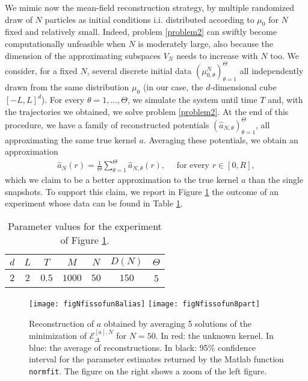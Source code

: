 We mimic now the  mean-field reconstruction strategy, by multiple randomized draw of $N$ particles as initial conditions i.i. distributed according to $\mu_0$ for $N$ fixed and relatively small. Indeed, problem \eqref{problem2} can swiftly become computationally unfeasible when $N$ is moderately large, also because the dimension of the approximating subspaces $V_N$ needs to increase with $N$ too.  We consider, for a fixed $N$, several discrete initial data $(\mu^N_{0,\theta})_{\theta= 1}^{\Theta}$ all independently drawn from the same distribution $\mu_0$ (in our case, the $d$-dimensional cube $[-L,L]^d$). For every $\theta = 1,\ldots,\Theta$, we simulate the system until time $T$ and, with the trajectories we obtained, we solve problem \eqref{problem2}. At the end of this procedure, we have a family of reconstructed potentials $(\widehat{a}_{N,\theta})_{\theta= 1}^{\Theta}$, all approximating the same true kernel $a$. Averaging these potentials, we obtain an approximation
\begin{align*}
\widehat{a}_N(r) = \frac{1}{\Theta} \sum^{\Theta}_{\theta = 1}\widehat{a}_{N,\theta}(r), \quad \text{ for every } r \in [0,R],
\end{align*}
which we claim to be a better approximation to the true kernel $a$ than the single snapshots. To support this claim, we report in Figure \ref{fixedN} the outcome of an experiment whose data can be found in Table \ref{tab:fig5}.

\begin{table}[h]
\begin{center}
\begin{tabular}{ |c|c|c|c|c|c|c| }
\hline
  $d$ & $L$ & $T$ & $M$ & $N$ & $D(N)$ & $\Theta$ \\
\hline
\hline
  $2$ & $2$ & $0.5$ & $1000$ & $50$ & $150$ & 5  \\
\hline
\end{tabular}
\end{center}
\vspace{-0.5cm}
\caption{Parameter values for the experiment of Figure \ref{fixedN}.} \label{tab:fig5} 
\end{table}

\begin{figure}[h!]
\begin{center}
\hspace{-1cm}
\texttt{[image: figNfissofun8alias]}\hspace{-0.9cm}
\texttt{[image: figNfissofun8part]}
\end{center}
\caption{Reconstruction of $a$ obtained by averaging 5 solutions of the minimization of $\mathcal{E}^{[a],N}_\Delta$ for $N = 50$. In red: the unknown kernel. In blue: the average of reconstructions. In black: 95\% confidence interval for the parameter estimates returned by the Matlab function \texttt{normfit}. The figure on the right shows a zoom of the left figure.}\label{fixedN}
\end{figure}